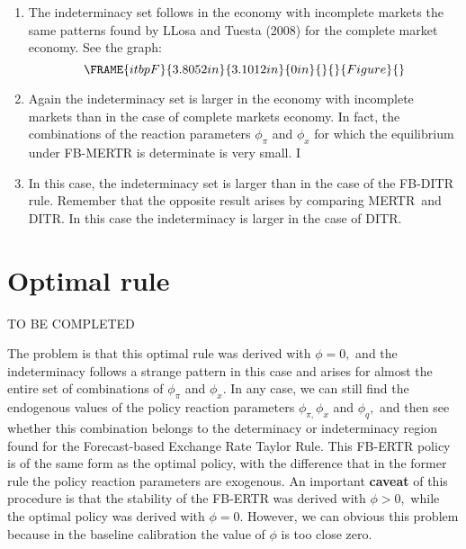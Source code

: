 \documentclass{article}
\begin{document}
\begin{enumerate}
\item The indeterminacy set follows in the economy with incomplete markets
the same patterns found by LLosa and Tuesta (2008) for the complete market
economy. See the graph:%
\begin{equation*}
\FRAME{itbpF}{3.8052in}{3.1012in}{0in}{}{}{Figure}{\special{language
"Scientific Word";type "GRAPHIC";maintain-aspect-ratio TRUE;display
"USEDEF";valid_file "T";width 3.8052in;height 3.1012in;depth
0in;original-width 6.9894in;original-height 5.6879in;cropleft "0";croptop
"1";cropright "1";cropbottom "0";tempfilename
'L5CL4V00.wmf';tempfile-properties "XPR";}}
\end{equation*}

\item Again the indeterminacy set is larger in the economy with incomplete
markets than in the case of complete markets economy. In fact, the
combinations of the reaction parameters $\phi _{\pi }$ and $\phi _{x}$ for
which the equilibrium under FB-MERTR is determinate is very small. I

\item In this case, the indeterminacy set is larger than in the case of the
FB-DITR rule. Remember that the opposite result arises by comparing MERTR\
and DITR. In this case the indeterminacy is larger in the case of DITR.
\end{enumerate}

\section{Optimal rule}

TO BE COMPLETED

The problem is that this optimal rule was derived with $\phi =0,$ and the
indeterminacy follows a strange pattern in this case and arises for almost
the entire set of combinations of $\phi _{\pi }$ and $\phi _{x}.$ In any
case, we can still find the endogenous values of the policy reaction
parameters $\phi _{\pi ,}\phi _{x}$ and $\phi _{q},$ and then see whether
this combination belongs to the determinacy or indeterminacy region found
for the Forecast-based Exchange Rate Taylor Rule. This FB-ERTR policy is of
the same form as the optimal policy, with the difference that in the former
rule the policy reaction parameters are exogenous. An important \textbf{%
caveat} of this procedure is that the stability of the FB-ERTR was derived
with $\phi >0,$ while the optimal policy was derived with $\phi =0.$
However, we can obvious this problem because in the baseline calibration the
value of $\phi $ is too close zero.
\end{document}
